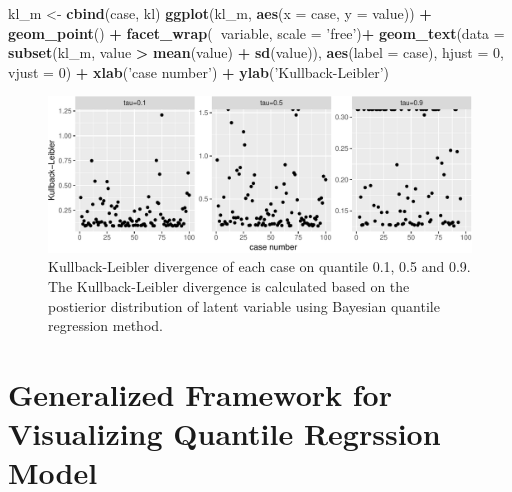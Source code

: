 \documentclass[11pt,a4paper,]{article}
\newenvironment{Shaded}{\begin{snugshade}}{\end{snugshade}}
\newcommand{\KeywordTok}[1]{\textcolor[rgb]{0.13,0.29,0.53}{\textbf{#1}}}
\newcommand{\DataTypeTok}[1]{\textcolor[rgb]{0.13,0.29,0.53}{#1}}
\newcommand{\DecValTok}[1]{\textcolor[rgb]{0.00,0.00,0.81}{#1}}
\newcommand{\StringTok}[1]{\textcolor[rgb]{0.31,0.60,0.02}{#1}}
\newcommand{\OperatorTok}[1]{\textcolor[rgb]{0.81,0.36,0.00}{\textbf{#1}}}
\newcommand{\NormalTok}[1]{#1}
\theoremstyle{definition}
\theoremstyle{definition}
\theoremstyle{remark}
\begin{document}
\begin{Shaded}
\begin{Highlighting}[]
\NormalTok{kl_m <-}\StringTok{ }\KeywordTok{cbind}\NormalTok{(case, kl)}
\KeywordTok{ggplot}\NormalTok{(kl_m, }\KeywordTok{aes}\NormalTok{(}\DataTypeTok{x =}\NormalTok{ case, }\DataTypeTok{y =}\NormalTok{ value)) }\OperatorTok{+}
\StringTok{  }\KeywordTok{geom_point}\NormalTok{() }\OperatorTok{+}
\StringTok{  }\KeywordTok{facet_wrap}\NormalTok{(}\OperatorTok{~}\NormalTok{variable, }\DataTypeTok{scale =} \StringTok{'free'}\NormalTok{)}\OperatorTok{+}
\StringTok{  }\KeywordTok{geom_text}\NormalTok{(}\DataTypeTok{data =} \KeywordTok{subset}\NormalTok{(kl_m, value }\OperatorTok{>}\StringTok{ }\KeywordTok{mean}\NormalTok{(value) }\OperatorTok{+}\StringTok{ }\KeywordTok{sd}\NormalTok{(value)),}
            \KeywordTok{aes}\NormalTok{(}\DataTypeTok{label =}\NormalTok{ case), }\DataTypeTok{hjust =} \DecValTok{0}\NormalTok{, }\DataTypeTok{vjust =} \DecValTok{0}\NormalTok{) }\OperatorTok{+}
\StringTok{  }\KeywordTok{xlab}\NormalTok{(}\StringTok{'case number'}\NormalTok{) }\OperatorTok{+}
\StringTok{  }\KeywordTok{ylab}\NormalTok{(}\StringTok{'Kullback-Leibler'}\NormalTok{)}
\end{Highlighting}
\end{Shaded}

\begin{figure}

{\centering \includegraphics{main_files/figure-latex/unnamed-chunk-10-1} 

}

\caption{Kullback-Leibler divergence of each case on quantile 0.1, 0.5 and 0.9. The Kullback-Leibler divergence is calculated based on the postierior distribution of latent variable using Bayesian quantile regression method.}\label{fig:unnamed-chunk-10}
\end{figure}

\section{Generalized Framework for Visualizing Quantile Regrssion
Model}\label{generalized-framework-for-visualizing-quantile-regrssion-model}
\end{document}
